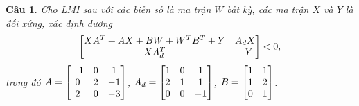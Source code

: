 \documentclass[11pt]{article}
\newtheorem{bt}{Câu}
\begin{document}
\begin{bt}
Cho LMI sau với các biến số là ma trận $W$ bất kỳ, các ma trận $X$ và $Y$ là đối xứng, xác định dương
%
\begin{equation}
	\begin{bmatrix} XA^T + AX + BW + W^TB^T+ Y & A_d X \\ XA^T_d & -Y \end{bmatrix} < 0,
\end{equation}
%
trong đó $A = \begin{bmatrix} -1 & 0 & 1 \\ 0 & 2 & -1 \\ 2 & 0 & -3 \end{bmatrix}$, $A_d = \begin{bmatrix}  1 & 0 & 1 \\ 2 & 1 & 1 \\ 0  & 0 & -1 \end{bmatrix}$, $B = \begin{bmatrix} 1 & 1 \\ 1 & 2 \\ 0 & 1 \end{bmatrix}$.
\end{bt}
%
\end{document}
